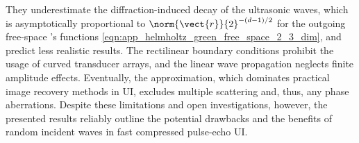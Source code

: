 They underestimate
the diffraction-induced decay of
the ultrasonic waves, which is asymptotically proportional to
$\norm{ \vect{r} }{2}^{ - ( d - 1 ) / 2 }$ for
the outgoing free-space 's functions
\eqref{eqn:app_helmholtz_green_free_space_2_3_dim}, and predict
less realistic results.
The rectilinear boundary conditions prohibit
the usage of
curved transducer arrays, and
the linear wave propagation neglects
finite amplitude effects.
Eventually,
the  approximation, which dominates
practical image recovery methods in
\ac{UI}, excludes
multiple scattering and, thus, any
phase aberrations.
Despite
these limitations and
open investigations, however,
the presented results reliably outline
the potential drawbacks and
the benefits of
random incident waves in
fast compressed pulse-echo \ac{UI}.
